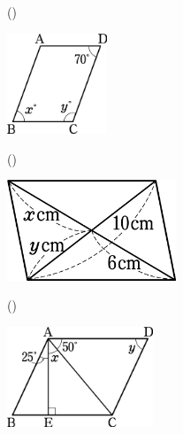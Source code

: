 \documentclass[
  12pt,a4paper,lualatex,ja=standard]{bxjsarticle}
\begin{document}
\begin{flushleft}
\begin{multicols}{2}
\begin{center}
\end{center}

\columnbreak

()\hspace{2.5pt}

\begin{center}
\def\@captype{figure}
\includegraphics[height=30mm]{img/img2.jpg}

\end{center}

\end{multicols}

\vspace{5mm}

\begin{multicols}{2}
()\hspace{2.5pt}

\begin{center}
\def\@captype{figure}
\includegraphics[height=30mm]{img/img3.jpg}

\end{center}

\columnbreak

()\hspace{2.5pt}

\begin{center}
\def\@captype{figure}
\includegraphics[height=30mm]{img/img4.jpg}

\end{center}


\end{multicols}
\end{flushleft}
\end{document}
